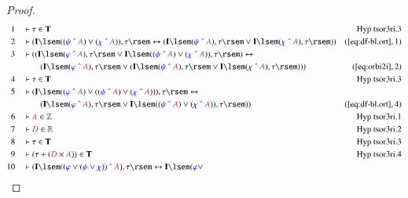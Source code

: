 \begin{proof}
\begin{align}
  1 &&  & \vdash \tau \in \mathbf{T}&\text{Hyp~tsor3ri.3}\notag%
  \\ 2 &&  & \vdash ( \mathbf{I} \lsem ( ( \mw{\psi} ~\string^~ \mc{A} ) \vee (
      \mw{\chi} ~\string^~ \mc{A} ) ) , \tau \rsem
      \leftrightarrow ( \mathbf{I} \lsem ( \mw{\psi}
      ~\string^~ \mc{A} ) , \tau \rsem \vee \mathbf{I}
      \lsem ( \mw{\chi} ~\string^~ \mc{A} ) , \tau \rsem )
      )&(\mbox{\ref{eq:df-bl.ort}},1)\notag
  \\ 3 &&  & \vdash ( ( \mathbf{I} \lsem ( \mw{\varphi} ~\string^~ \mc{A} ) ,
      \tau \rsem \vee \mathbf{I} \lsem ( ( \mw{\psi}
      ~\string^~ \mc{A} ) \vee ( \mw{\chi} ~\string^~
      \mc{A} ) ) , \tau \rsem ) \leftrightarrow  \notag \\ & & & \qquad
     (
      \mathbf{I} \lsem ( \mw{\varphi} ~\string^~ \mc{A} ) ,
      \tau \rsem \vee ( \mathbf{I} \lsem ( \mw{\psi}
      ~\string^~ \mc{A} ) , \tau \rsem \vee \mathbf{I}
      \lsem ( \mw{\chi} ~\string^~ \mc{A} ) , \tau \rsem )
      ) )&(\mbox{\ref{eq:orbi2i}},2)\notag
  \\ 4 &&  & \vdash \tau \in \mathbf{T}&\text{Hyp~tsor3ri.3}\notag%
  \\ 5 &&  & \vdash ( \mathbf{I} \lsem ( ( \mw{\varphi} ~\string^~ \mc{A} )
      \vee ( ( \mw{\psi} ~\string^~ \mc{A} ) \vee (
      \mw{\chi} ~\string^~ \mc{A} ) ) ) , \tau \rsem
      \leftrightarrow  \notag \\ & & & \qquad
     ( \mathbf{I} \lsem ( \mw{\varphi}
      ~\string^~ \mc{A} ) , \tau \rsem \vee \mathbf{I}
      \lsem ( ( \mw{\psi} ~\string^~ \mc{A} ) \vee (
      \mw{\chi} ~\string^~ \mc{A} ) ) , \tau \rsem )
      )&(\mbox{\ref{eq:df-bl.ort}},4)\notag
  \\ 6 &&  & \vdash \mc{A} \in
      \mathbb{Z}&\text{Hyp~tsor3ri.1}\notag%
  \\ 7 &&  & \vdash \mc{D} \in
      \mathbb{R}&\text{Hyp~tsor3ri.2}\notag%
  \\ 8 &&  & \vdash \tau \in \mathbf{T}&\text{Hyp~tsor3ri.3}\notag%
  \\ 9 &&  & \vdash ( \tau + ( \mc{D} \times \mc{A} ) ) \in
      \mathbf{T}&\text{Hyp~tsor3ri.4}\notag%
  \\ 10 &&  & \vdash ( \mathbf{I} \lsem ( ( \mw{\varphi} \vee ( \mw{\psi} \vee
      \mw{\chi} ) ) ~\string^~ \mc{A} ) , \tau \rsem
      \leftrightarrow \mathbf{I} \lsem ( \mw{\varphi} \vee

\end{align}
\end{proof}
